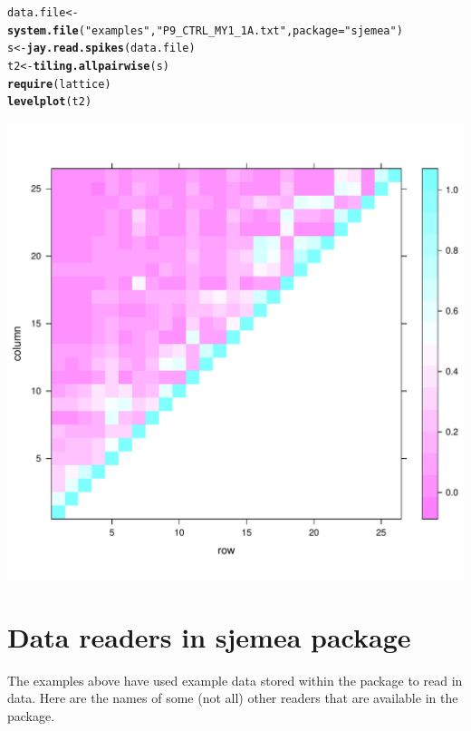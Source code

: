 \documentclass{article}\usepackage[]{graphicx}\usepackage[]{color}
\makeatletter
\def\maxwidth{ %
  \ifdim\Gin@nat@width>\linewidth
    \linewidth
  \else
    \Gin@nat@width
  \fi
}
\newcommand{\hlstr}[1]{\textcolor[rgb]{0.192,0.494,0.8}{#1}}%
\newcommand{\hlstd}[1]{\textcolor[rgb]{0.345,0.345,0.345}{#1}}%
\newcommand{\hlkwb}[1]{\textcolor[rgb]{0.69,0.353,0.396}{#1}}%
\newcommand{\hlkwc}[1]{\textcolor[rgb]{0.333,0.667,0.333}{#1}}%
\newcommand{\hlkwd}[1]{\textcolor[rgb]{0.737,0.353,0.396}{\textbf{#1}}}%
\newenvironment{kframe}{%
 \def\at@end@of@kframe{}%
 \ifinner\ifhmode%
  \def\at@end@of@kframe{\end{minipage}}%
  \begin{minipage}{\columnwidth}%
 \fi\fi%
 \def\FrameCommand##1{\hskip\@totalleftmargin \hskip-\fboxsep
 \colorbox{shadecolor}{##1}\hskip-\fboxsep
     \hskip-\linewidth \hskip-\@totalleftmargin \hskip\columnwidth}%
 \MakeFramed {\advance\hsize-\width
   \@totalleftmargin\z@ \linewidth\hsize
   \@setminipage}}%
 {\par\unskip\endMakeFramed%
 \at@end@of@kframe}
\newenvironment{knitrout}{}{} %
\makeatother
\begin{document}
\begin{knitrout}
\color{fgcolor}\begin{kframe}
\begin{alltt}
\hlstd{data.file} \hlkwb{<-} \hlkwd{system.file}\hlstd{(}\hlstr{"examples"}\hlstd{,} \hlstr{"P9_CTRL_MY1_1A.txt"}\hlstd{,} \hlkwc{package} \hlstd{=} \hlstr{"sjemea"}\hlstd{)}
\hlstd{s} \hlkwb{<-} \hlkwd{jay.read.spikes}\hlstd{(data.file)}
\hlstd{t2} \hlkwb{<-} \hlkwd{tiling.allpairwise}\hlstd{(s)}
\hlkwd{require}\hlstd{(lattice)}
\hlkwd{levelplot}\hlstd{(t2)}
\end{alltt}
\end{kframe}
\includegraphics[width=\maxwidth]{figure/tiling-correlation} 

\end{knitrout}







\section*{Data readers in sjemea package}
\label{sec:input}

The examples above have used example data stored within the package to
read in data.  Here are the names of some (not all) other readers
that are available in the package.
 
\end{document}
